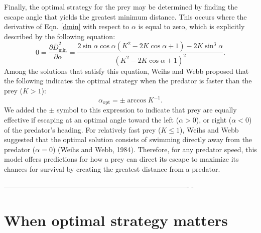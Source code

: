 \documentclass[12pt]{article}
\def\d{\partial}
\newcommand{\ol}{\overline}
\begin{document}
Finally, the optimal strategy for the prey may be determined by finding the
escape angle that yields the greatest minimum distance. This occurs where the
derivative of Eqn. \ref{dmin} with respect to $\alpha$ is equal to zero, which
is explicitly described by the following equation:
%
\begin{equation}
0 = \frac{\d \ol{D}^2_{\text{min}}}{\d \alpha} = \frac{2\sin\alpha \cos\alpha
(K^2 -2 K \cos\alpha+1)-2 K \sin^3\alpha}{(K^2-2 K \cos\alpha + 1)^2}. 
\label{eq37weihs}
\end{equation}
%
Among the solutions that satisfy this equation, Weihs and Webb proposed that
the following indicates the optimal strategy when the predator is faster than
the prey ($K>1$):
%
\begin{equation}
\alpha_{\text{opt}} = \pm \arccos K^{-1}. 
\label{K>1}
\end{equation}
%
We added the $\pm$ symbol to this expression to indicate that prey are equally
effective if escaping at an optimal angle toward the left ($\alpha>0$), or
right ($\alpha<0$) of the predator's heading. For relatively fast prey
($K\leq1$), Weihs and Webb suggested that the optimal solution consists of
swimming directly away from the predator ($\alpha = 0$)  (Weihs and Webb,
1984). Therefore, for any predator speed, this model offers predictions for how
a prey can direct its escape to maximize its chances for survival by creating
the greatest distance from a predator. 

%
-------------------------------------------------------------------------------
-
\section{When optimal strategy matters}
\end{document}
